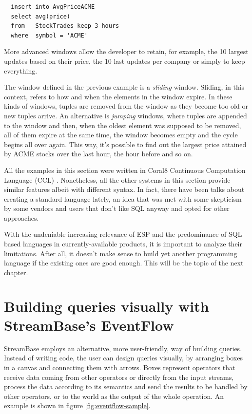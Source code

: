 \documentclass[a4,11pt]{report}
\begin{document}
\begin{lstlisting}
  insert into AvgPriceACME
  select avg(price)
  from   StockTrades keep 3 hours
  where  symbol = 'ACME'
\end{lstlisting}

More advanced windows allow the developer to retain, for example, the
10 largest updates based on their price, the 10 last updates per
company or simply to keep everything.

The window defined in the previous example is a \emph{sliding}
window. Sliding, in this context, refers to how and when the elements
in the window expire. In these kinds of windows, tuples are removed
from the window as they become too old or new tuples arrive. An
alternative is \emph{jumping} windows, where tuples are appended to
the window and then, when the oldest element was supposed to be
removed, all of them expire at the same time, the window becomes empty
and the cycle begins all over again. This way, it's possible to find
out the largest price attained by ACME stocks over the last hour, the
hour before and so on.

All the examples in this section were written in Coral8 Continuous
Computation Language (CCL) \cite{coral8-ccl:www}. Nonetheless, all the
other systems in this section provide similar features albeit with
different syntax. In fact, there have been talks about creating a
standard language lately, an idea that was met with some skepticism
\cite{sql-impendance-mismatch:post} by some vendors and users that
don't like SQL anyway and opted for other approaches.

With the undeniable increasing relevance of ESP and the predominance
of SQL-based languages in currently-available products, it is
important to analyze their limitations. After all, it doesn't make
sense to build yet another programming language if the existing ones
are good enough. This will be the topic of the next chapter.

\section{Building queries visually with StreamBase's EventFlow}
\label{sec:eventflow}

StreamBase employs an alternative, more user-friendly, way of building
queries. Instead of writing code, the user can design queries
visually, by arranging boxes in a canvas and connecting them with
arrows. Boxes represent operators that receive data coming from other
operators or directly from the input streams, process the data
according to its semantics and send the results to be handled by other
operators, or to the world as the output of the whole operation. An
example is shown in figure \ref{fig:eventflow-sample}.
\end{document}
